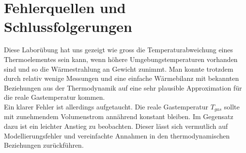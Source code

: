 \chapter{Fehlerquellen und Schlussfolgerungen}\label{sec:conclusion}

Diese Laborübung hat uns gezeigt wie gross die Temperaturabweichung eines Thermoelementes sein kann, wenn höhere Umgebungstemperaturen vorhanden sind und so die Wärmestrahlung an Gewicht zunimmt. Man konnte trotzdem durch relativ wenige Messungen und eine einfache Wärmebilanz mit bekannten Beziehungen aus der Thermodynamik auf eine sehr plausible Approximation für die reale Gastemperatur kommen.\\

Ein klarer Fehler ist allerdings aufgetaucht. Die reale Gastemperatur $T_{gas}$ sollte mit zunehmendem Volumenstrom annährend konstant bleiben. Im Gegensatz dazu ist ein leichter Anstieg zu beobachten. Dieser lässt sich vermutlich auf Modellierungsfehler und vereinfachte Annahmen in den thermodynamischen Beziehungen zurückführen.
